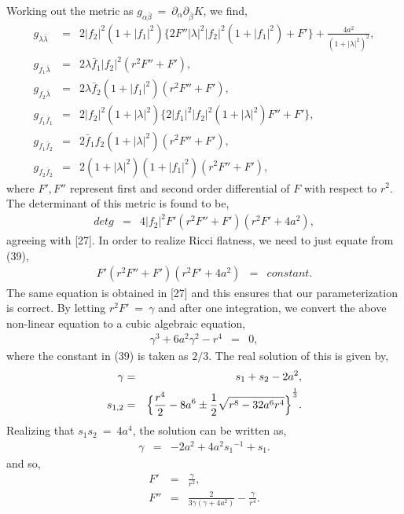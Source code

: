 \documentclass[a4paper,12pt]{article}
\begin{document}
Working out the metric as $g_{\alpha \bar{\beta}}\ =\ {\partial}_{\alpha}
{\partial}_{\bar{\beta}}K$, we find,
\begin{eqnarray}
g_{\lambda \bar{\lambda}}&=&2|f_2|^2(1+|f_1|^2)\{ 2F''|\lambda|^2|f_2|^2
(1+|f_1|^2)+F'\}+\frac{4a^2}{(1+|\lambda|^2)^2}, \nonumber \\
g_{f_1\bar{\lambda}}&=&2\lambda {\bar{f}}_1|f_2|^2(r^2F''+F'), \nonumber \\
g_{f_2\bar{\lambda}}&=&2\lambda {\bar{f}}_2(1+|f_1|^2)(r^2F''+F'), 
\nonumber \\
g_{f_1{\bar{f}}_1}&=&2|f_2|^2(1+|\lambda |^2)\{2|f_1|^2|f_2|^2(1+|\lambda
 |^2)F''+F'\}, \nonumber \\
g_{f_1{\bar{f}}_2}&=&2{\bar{f}}_1f_2(1+|\lambda |^2)(r^2F''+F'), \nonumber \\
g_{f_2{\bar{f}}_2}&=&2(1+|\lambda |^2)(1+|f_1|^2)(r^2F''+F'),
\end{eqnarray}
where $F', F''$ represent first and second order differential of $F$ with 
respect to $r^2$. The determinant of this metric is found to be,
\begin{eqnarray}
detg &=& 4|f_2|^2F'(r^2F''+F')(r^2F'+4a^2),
\end{eqnarray}
agreeing with [27]. In order to realize Ricci flatness, we need to just equate
from (39), 
\begin{eqnarray}
F'(r^2F''+F')(r^2F'+4a^2) &=& constant.
\end{eqnarray}
The same equation is obtained in [27] and this ensures that our parameterization 
is correct. By letting $r^2F'\ =\ \gamma$ and after one integration, we convert
the above non-linear equation to a cubic algebraic equation,
\begin{eqnarray}
{\gamma}^3+6a^2{\gamma}^2-r^4 &=& 0,
\end{eqnarray}
where the constant in (39) is taken as $2/3$. The real solution of this is 
given by,
\begin{eqnarray}
\gamma &=& s_1+s_2-2a^2, \nonumber \\
s_{1,2} &=& {\Bigl\{\frac{r^4}{2}-8a^6 \pm \frac{1}{2} \sqrt{{r^8}-
32a^6r^4}\Bigr\}}^
{\frac{1}{3}}.
\end{eqnarray}
Realizing that $s_1s_2\ =\ 4a^4$, the solution can be written as,
\begin{eqnarray}
\gamma &=& -2a^2+4a^2{s_1}^{-1}+s_1.
\end{eqnarray}
and so,
\begin{eqnarray}
F' &=& \frac{\gamma}{r^2}, \nonumber \\
F'' &=& \frac{2}{3\gamma (\gamma + 4a^2)}-\frac{\gamma}{r^4}.
\end{eqnarray}
\end{document}
